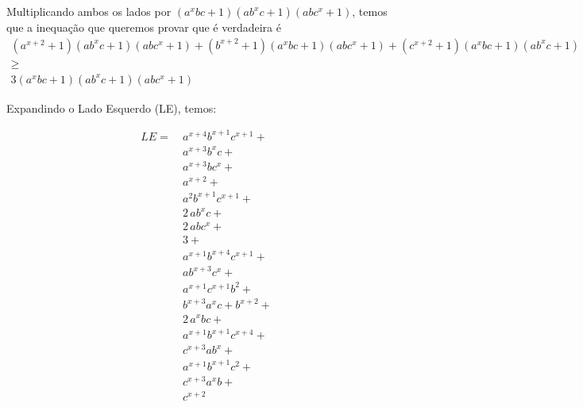 \documentclass[12pt, a4paper]{article}
\begin{document}
	\pagestyle{empty}

	Multiplicando ambos os lados por $\left( {a}^{x}bc+1 \right)  \left( a{b}^{x}c+1 \right)  \left( ab{
c}^{x}+1 \right)$, temos que a inequação que queremos provar que é verdadeira é
\begin{gather*}
({a}^{x+2}+1) (a{b}^{x}c+1) (ab{c}^{x}+1) +
({b}^{x+2}+1) ({a}^{x}bc+1) (ab{c}^{x}+1) + 
({c}^{x+2}+1) ({a}^{x}bc+1) (a{b}^{x}c+1)\\
\ge\\
3 ({a}^{x}bc+1) (a{b}^{x}c+1) (ab{c}^{x}+1) 
\end{gather*}

Expandindo o Lado Esquerdo (LE), temos:

\begin{align*}
	LE =\ & 	{a}^{x+4}{b}^{x+1}{c}^{x+1} +
\\	   &	    {a}^{x+3}{b}^{x}c +
\\	   &		{a}^{x+3}b{c}^{x} +
\\	   &		{a}^{x+2} +
\\	   &		{a}^{2}{b}^{x+1}{c}^{x+1} +
\\	   &		2\,a{b}^{x}c+
\\	   &		2\,ab{c}^{x}+
\\	   &		3+
\\	   &		{a}^{x+1}{b}^{x+4}{c}^{x+1}+
\\	   &		a{b}^{x+3}{c}^{x}+
\\	   &		{a}^{x+1}{c}^{x+1}{b}^{2}+
\\	   &		{b}^{x+3}{a}^{x}c+{b}^{x+2}+
\\	   &		2\,{a}^{x}bc+
\\	   &		{a}^{x+1}{b}^{x+1}{c}^{x+4}+
\\	   &		{c}^{x+3}a{b}^{x}+
\\	   &		{a}^{x+1}{b}^{x+1}{c}^{2}+
\\	   &		{c}^{x+3}{a}^{x}b+
\\	   &		{c}^{x+2}
\end{align*}
\end{document}
